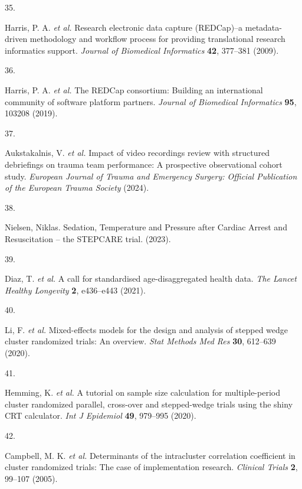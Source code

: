 \documentclass[
]{scrartcl}
\newlength{\cslhangindent}
\newlength{\csllabelwidth}
\newlength{\cslentryspacingunit} %
\newenvironment{CSLReferences}[2] %
 {%
  \setlength{\parindent}{0pt}
  \ifodd #1
  \let\oldpar\par
  \def\par{\hangindent=\cslhangindent\oldpar}
  \fi
  \setlength{\parskip}{#2\cslentryspacingunit}
 }%
 {}
\newcommand{\CSLLeftMargin}[1]{\parbox[t]{\csllabelwidth}{#1}}
\newcommand{\CSLRightInline}[1]{\parbox[t]{\linewidth - \csllabelwidth}{#1}\break}
\begin{document}
\begin{CSLReferences}{0}{0}
\leavevmode{}%
\CSLLeftMargin{35. }%
\CSLRightInline{Harris, P. A. \emph{et al.} Research electronic data
capture ({REDCap})--a metadata-driven methodology and workflow process
for providing translational research informatics support. \emph{Journal
of Biomedical Informatics} \textbf{42}, 377--381 (2009).}

\leavevmode{}%
\CSLLeftMargin{36. }%
\CSLRightInline{Harris, P. A. \emph{et al.} The {REDCap} consortium:
{Building} an international community of software platform partners.
\emph{Journal of Biomedical Informatics} \textbf{95}, 103208 (2019).}

\leavevmode{}%
\CSLLeftMargin{37. }%
\CSLRightInline{Aukstakalnis, V. \emph{et al.} Impact of video
recordings review with structured debriefings on trauma team
performance: A prospective observational cohort study. \emph{European
Journal of Trauma and Emergency Surgery: Official Publication of the
European Trauma Society} (2024).}

\leavevmode{}%
\CSLLeftMargin{38. }%
\CSLRightInline{Nielsen, Niklas. Sedation, {Temperature} and {Pressure}
after {Cardiac} {Arrest} and {Resuscitation} -- the {STEPCARE} trial.
(2023).}

\leavevmode{}%
\CSLLeftMargin{39. }%
\CSLRightInline{Diaz, T. \emph{et al.} A call for standardised
age-disaggregated health data. \emph{The Lancet Healthy Longevity}
\textbf{2}, e436--e443 (2021).}

\leavevmode{}%
\CSLLeftMargin{40. }%
\CSLRightInline{Li, F. \emph{et al.} Mixed-effects models for the design
and analysis of stepped wedge cluster randomized trials: An overview.
\emph{Stat Methods Med Res} \textbf{30}, 612--639 (2020).}

\leavevmode{}%
\CSLLeftMargin{41. }%
\CSLRightInline{Hemming, K. \emph{et al.} A tutorial on sample size
calculation for multiple-period cluster randomized parallel, cross-over
and stepped-wedge trials using the shiny CRT calculator. \emph{Int J
Epidemiol} \textbf{49}, 979--995 (2020).}

\leavevmode{}%
\CSLLeftMargin{42. }%
\CSLRightInline{Campbell, M. K. \emph{et al.} Determinants of the
intracluster correlation coefficient in cluster randomized trials: The
case of implementation research. \emph{Clinical Trials} \textbf{2},
99--107 (2005).}


\end{CSLReferences}
\end{document}

